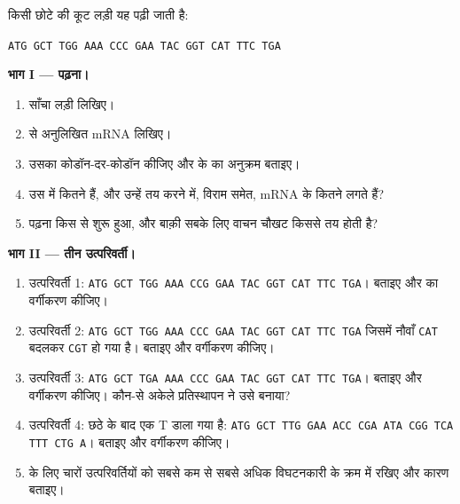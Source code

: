 \begin{problem}
\label{pb:g11:gene-expression:1}
किसी छोटे  की कूट लड़ी यह पढ़ी जाती है:
\begin{center}
\texttt{ATG GCT TGG AAA CCC GAA TAC GGT CAT TTC TGA}
\end{center}

\medskip
\noindent\textbf{भाग I ---  पढ़ना।}
\begin{enumerate}
  \item साँचा लड़ी लिखिए।
  \item {} से अनुलिखित mRNA लिखिए।
  \item उसका कोडॉन-दर-कोडॉन  कीजिए और  के  का
        अनुक्रम बताइए।
  \item उस  में कितने  हैं, और उन्हें तय करने में, विराम
        समेत, mRNA के कितने  लगते हैं?
  \item पढ़ना किस  से शुरू हुआ, और बाक़ी सबके लिए वाचन चौखट किससे तय
        होती है?
\end{enumerate}

\medskip
\noindent\textbf{भाग II --- तीन उत्परिवर्ती।}
\begin{enumerate}[resume]
  \item उत्परिवर्ती 1: \texttt{ATG GCT TGG AAA CCG GAA TAC GGT CAT TTC TGA}।
         बताइए और  का वर्गीकरण कीजिए।
  \item उत्परिवर्ती 2: \texttt{ATG GCT TGG AAA CCC GAA TAC GGT CAT TTC TGA}
        जिसमें नौवाँ  \texttt{CAT} बदलकर \texttt{CGT} हो गया है।
         बताइए और वर्गीकरण कीजिए।
  \item उत्परिवर्ती 3: \texttt{ATG GCT TGA AAA CCC GAA TAC GGT CAT TTC TGA}।
         बताइए और वर्गीकरण कीजिए। कौन-से अकेले प्रतिस्थापन ने उसे
        बनाया?
  \item उत्परिवर्ती 4: छठे  के बाद एक T डाला गया है:
        \texttt{ATG GCT TTG GAA ACC CGA ATA CGG TCA TTT CTG A}। 
        बताइए और वर्गीकरण कीजिए।
  \item {} के लिए चारों उत्परिवर्तियों को सबसे कम से सबसे अधिक
        विघटनकारी के क्रम में रखिए और कारण बताइए।
\end{enumerate}


\end{problem}
